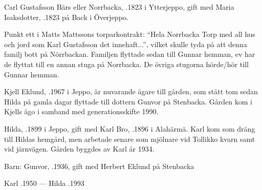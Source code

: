 %
Carl Gustafsson Bärs eller Norrbacka, .1823 i Ytterjeppo, gift med Maria Isaksdotter, .1823 på Back i Överjeppo.
\begin{jhchildren}
  \item {}
  \item {}
  \item {}
  \item {}
  \item {}
  \item {}
\end{jhchildren}

Punkt ett i Matts Mattssons torparkontrakt: ``Hela Norrbacka Torp med all hus och jord som Karl Gustafsson det innehaft...'', vilket skulle tyda på att denna familj bott på Nörrbackan. Familjen flyttade sedan till Gunnar hemman, ev har de flyttat till en annan stuga på Norrbacka. De övriga stugorna hörde/hör till Gunnar hemman.



%



%
Kjell Eklund, .1967 i Jeppo, är nuvarande ägare till gården, som stått tom sedan Hilda på gamla dagar flyttade till dottern Gunvor på Stenbacka. Gården kom i Kjells ägo i samband med generationsskifte 1990.\jhvspace{}


%
Hilda, .1899 i Jeppo, gift med Karl Bro, .1896 i Alahärmä. Karl kom som dräng till Hildas hemgård, men arbetade senare som mjölnare vid Tollikko kvarn samt vid järnvägen. Gården byggdes av Karl år 1934.

Barn: Gunvor, .1936, gift med Herbert Eklund på Stenbacka

Karl .1950  ---  Hilda .1993



